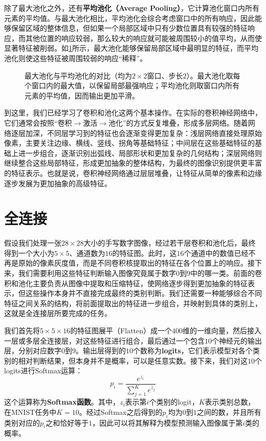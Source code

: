 除了最大池化之外，还有\textbf{平均池化（Average Pooling）}，它计算池化窗口内所有元素的平均值。与最大池化相比，平均池化会综合考虑窗口中的所有响应，因此能够保留区域的整体信息，但如果一个局部区域中只有少数位置具有较强的特征响应，而其他位置的响应较弱，那么较大的响应就可能被周围较小的值平均，从而使显著特征被削弱。如\cref{fig:pooling_comparison}所示，最大池化能够保留局部区域中最明显的特征，而平均池化则使这些特征被周围较弱的响应“稀释”。

\begin{figure}[H]
    \caption{最大池化与平均池化的对比（均为$2\times 2$窗口、步长$2$）。最大池化取每个窗口内的最大值，以保留局部最强响应；平均池化则取窗口内所有元素的平均值，因而输出更加平滑。}
    \label{fig:pooling_comparison}
\end{figure}

到这里，我们已经学习了卷积和池化这两个基本操作。在实际的卷积神经网络中，它们通常会按照“卷积$\rightarrow$激活$\rightarrow$池化”的方式反复堆叠，形成多层网络。随着网络逐层加深，不同层学习到的特征也会逐渐变得更加复杂：浅层网络直接处理原始像素，主要关注边缘、横线、竖线、拐角等基础特征；中间层在这些基础特征的基础上进一步组合，逐渐识别出弧线、局部形状和更加复杂的几何结构；深层网络则继续整合这些局部特征，形成更加抽象的整体结构，为最终的图像识别提供更丰富的特征表示。也就是说，卷积神经网络通过层层堆叠，让特征从简单的像素和边缘逐步发展为更加抽象的高级特征。

\section{全连接}

假设我们处理一张$28\times28$大小的手写数字图像，经过若干层卷积和池化后，最终得到一个大小为$5\times5$、通道数为$16$的特征图。此时，这$16$个通道中的数值已经不再是原始的像素灰度值，而是不同卷积核提取出的特征在各个位置上的响应。接下来，我们需要利用这些特征判断输入图像究竟属于数字$0$到$9$中的哪一类。前面的卷积和池化主要负责从图像中提取和压缩特征，使网络逐步得到更加抽象的特征表示，但这些操作本身并不直接完成最终的类别判断。我们还需要一种能够综合不同特征之间关系的结构，将前面提取出的特征进一步组合，并映射到具体的类别上，这就是全连接层所要完成的任务。

我们首先将$5\times5\times16$的特征图展平（Flatten）成一个$400$维的一维向量，然后接入一层或多层全连接层，对这些特征进行组合，最后通过一个包含$10$个神经元的输出层，分别对应数字$0$到$9$。输出层得到的$10$个数称为\textbf{logits}，它们表示模型对各个类别的相对判断结果，但本身并不是概率，可以是任意实数。接下来，我们对这$10$个logits进行Softmax运算：
$$
p_i=\frac{e^{z_i}}{\sum_{j=1}^{K}e^{z_j}}
$$
这个运算称为\textbf{Softmax函数}。其中，$z_i$表示第$i$个类别的logit，$K$表示类别总数，在MNIST任务中$K=10$。经过Softmax之后得到的$p_i$均为$0$到$1$之间的数，并且所有类别对应的$p_i$之和恰好等于$1$，因此可以将其解释为模型预测输入图像属于第$i$类的概率。

